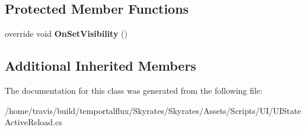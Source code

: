 \subsection*{Protected Member Functions}
\begin{DoxyCompactItemize}
\item 
\hypertarget{class_skyrates_1_1_u_i_1_1_u_i_state_active_reload_a4f48d85e5422563c6d9d618cc5f3d0c6}{override void {\bfseries On\-Set\-Visibility} ()}\label{class_skyrates_1_1_u_i_1_1_u_i_state_active_reload_a4f48d85e5422563c6d9d618cc5f3d0c6}

\end{DoxyCompactItemize}
\subsection*{Additional Inherited Members}


The documentation for this class was generated from the following file\-:\begin{DoxyCompactItemize}
\item 
/home/travis/build/temportalflux/\-Skyrates/\-Skyrates/\-Assets/\-Scripts/\-U\-I/U\-I\-State\-Active\-Reload.\-cs\end{DoxyCompactItemize}

